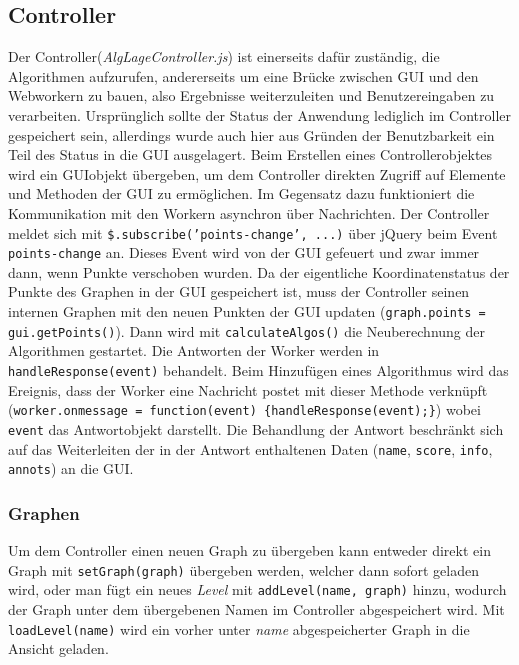 \documentclass[a4paper,twocolumn]{scrartcl}
\begin{document}
\subsection{Controller}
Der Controller(\emph{AlgLageController.js}) ist einerseits dafür zuständig, die Algorithmen aufzurufen, andererseits um eine Brücke zwischen GUI und den Webworkern zu bauen, also Ergebnisse weiterzuleiten und Benutzereingaben zu verarbeiten. 
Ursprünglich sollte der Status der Anwendung lediglich im Controller gespeichert sein, allerdings wurde auch hier aus Gründen der Benutzbarkeit ein Teil des Status in die GUI ausgelagert.
Beim Erstellen eines Controllerobjektes wird ein GUIobjekt übergeben, um dem Controller direkten Zugriff auf Elemente und Methoden der GUI zu ermöglichen.
Im Gegensatz dazu funktioniert die Kommunikation mit den Workern asynchron über Nachrichten. Der Controller meldet sich mit \texttt{\$.subscribe('points-change', ...)} über jQuery beim Event \texttt{points-change} an. Dieses Event wird von der GUI gefeuert und zwar immer dann, wenn Punkte verschoben wurden. Da der eigentliche Koordinatenstatus der Punkte des Graphen in der GUI gespeichert ist, muss der Controller seinen internen Graphen mit den neuen Punkten der GUI updaten (\texttt{graph.points = gui.getPoints()}). Dann wird mit \texttt{calculateAlgos()} die Neuberechnung der Algorithmen gestartet.
Die Antworten der Worker werden in \texttt{handleResponse(event)} behandelt. Beim Hinzufügen eines Algorithmus wird das Ereignis, dass der Worker eine Nachricht postet mit dieser Methode verknüpft (\texttt{worker.onmessage = function(event) \{handleResponse(event);\}}) wobei \texttt{event} das Antwortobjekt darstellt.
Die Behandlung der Antwort beschränkt sich auf das Weiterleiten der in der Antwort enthaltenen Daten (\texttt{name}, \texttt{score}, \texttt{info}, \texttt{annots}) an die GUI.

\subsubsection{Graphen}
Um dem Controller einen neuen Graph zu übergeben kann entweder direkt ein Graph mit \texttt{setGraph(graph)} übergeben werden, welcher dann sofort geladen wird, oder man fügt ein neues \emph{Level} mit \texttt{addLevel(name, graph)} hinzu, wodurch der Graph unter dem übergebenen Namen im Controller abgespeichert wird. Mit \texttt{loadLevel(name)} wird ein vorher unter \emph{name} abgespeicherter Graph in die Ansicht geladen.
\end{document}
